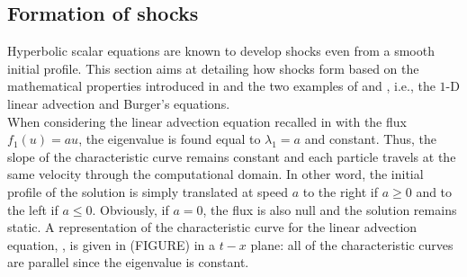 \subsection{Formation of shocks}\label{sec:shock_form}
Hyperbolic scalar equations are known to develop shocks even from a smooth initial profile. This section aims at detailing how shocks form based on the mathematical properties introduced in  and the two examples of  and , i.e., the $1$-D linear advection and Burger's equations.\\

When considering the linear advection equation recalled in  with the flux $f_1(u) = au$, the eigenvalue is found equal to $\lambda_1=a$ and constant. Thus, the slope of the characteristic curve remains constant and each particle travels at the same velocity through the computational domain. In other word, the initial profile of the solution is simply translated at speed $a$ to the right if $a \geq 0$ and to the left if $a \leq 0$. Obviously, if $a=0$, the flux is also null and the solution remains static. A representation of the characteristic curve for the linear advection equation, , is given in (FIGURE) in a $t-x$ plane: all of the characteristic curves are parallel since the eigenvalue is constant.


